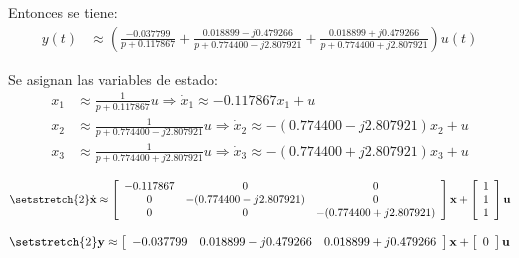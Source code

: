 Entonces se tiene:
\begin{align*}
  y(t) &\approx \left(
    \frac{-0.037799}{p + 0.117867}
    + \frac{0.018899 - j0.479266}{p + 0.774400 - j2.807921}
    + \frac{0.018899 + j0.479266}{p + 0.774400 + j2.807921}
  \right) u(t)
\end{align*}

Se asignan las variables de estado:
\begin{align*}
  x_1 &\approx \frac{1}{p + 0.117867}u
  \Rightarrow \dot{x}_1 \approx -0.117867x_1 + u
  \\
  x_2 &\approx \frac{1}{p + 0.774400 - j2.807921}u
  \Rightarrow \dot{x}_2 \approx -(0.774400 - j2.807921)x_2 + u
  \\
  x_3 &\approx \frac{1}{p + 0.774400 + j2.807921}u
  \Rightarrow \dot{x}_3 \approx -(0.774400 + j2.807921)x_3 + u
\end{align*}

\[ \setstretch{2}
  \dot{\textbf{x}}\approx
  \left[
    {\begin{array}{ccc}
      -0.117867 & 0                       & 0 \\
      0         & -(0.774400 - j2.807921) & 0 \\
      0         & 0                       & -(0.774400 + j2.807921) \\
    \end{array}}
  \right]
  \textbf{x} +
  \left[
    {\begin{array}{cc}
      1 \\
      1 \\
      1 \\
    \end{array}}
  \right]
  \textbf{u}
\]

\[ \setstretch{2}
  \textbf{y}\approx
  \left[
    {\begin{array}{ccc}
      -0.037799 & 0.018899-j0.479266 & 0.018899+j0.479266 \\
    \end{array}}
  \right]
  \textbf{x} +
  \left[
    {\begin{array}{c}
      0
    \end{array}}
  \right]
  \textbf{u}
\]
